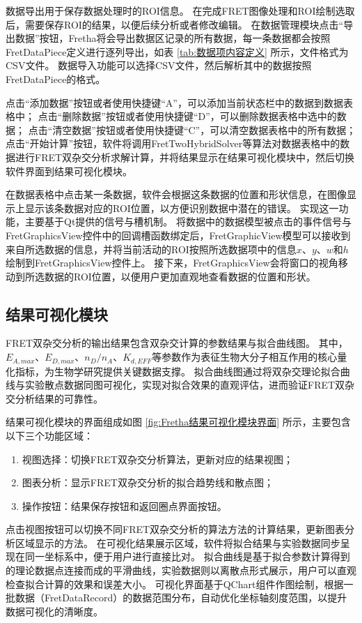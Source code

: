 数据导出用于保存数据处理时的ROI信息。
在完成FRET图像处理和ROI绘制选取后，需要保存ROI的结果，以便后续分析或者修改编辑。
在数据管理模块点击“导出数据”按钮，Fretha将会导出数据区记录的所有数据，每一条数据都会按照FretDataPiece定义进行逐列导出，如表 \ref{tab:数据项内容定义} 所示，文件格式为CSV文件。
数据导入功能可以选择CSV文件，然后解析其中的数据按照FretDataPiece的格式。

点击“添加数据”按钮或者使用快捷键“A”，可以添加当前状态栏中的数据到数据表格中；
点击“删除数据”按钮或者使用快捷键“D”，可以删除数据表格中选中的数据；
点击“清空数据”按钮或者使用快捷键“C”，可以清空数据表格中的所有数据；
点击“开始计算”按钮，软件将调用FretTwoHybridSolver等算法对数据表格中的数据进行FRET双杂交分析求解计算，并将结果显示在结果可视化模块中，然后切换软件界面到结果可视化模块。

在数据表格中点击某一条数据，软件会根据这条数据的位置和形状信息，在图像显示上显示该条数据对应的ROI位置，以方便识别数据中潜在的错误。
实现这一功能，主要基于Qt提供的信号与槽机制。
将数据中的数据模型被点击的事件信号与FretGraphicsView控件中的回调槽函数绑定后，FretGraphicView模型可以接收到来自所选数据的信息，并将当前活动的ROI按照所选数据项中的信息$x$、$y$、$w$和$h$绘制到FretGraphicsView控件上。
接下来，FretGraphicsView会将窗口的视角移动到所选数据的ROI位置，以便用户更加直观地查看数据的位置和形状。

\subsection{结果可视化模块}
\label{sec:结果可视化模块}
\ifshowtext
FRET双杂交分析的输出结果包含双杂交计算的参数结果与拟合曲线图。
其中，$E_{A,max}$、$E_{D,max}$、$n_D/n_A$、$K_{d,EFF}$等参数作为表征生物大分子相互作用的核心量化指标，为生物学研究提供关键数据支撑。
拟合曲线图通过将双杂交理论拟合曲线与实验散点数据同图可视化，实现对拟合效果的直观评估，进而验证FRET双杂交分析结果的可靠性。

结果可视化模块的界面组成如图 \ref{fig:Fretha结果可视化模块界面} 所示，主要包含以下三个功能区域：
\begin{enumerate}
  \item 视图选择：切换FRET双杂交分析算法，更新对应的结果视图；
  \item 图表分析：显示FRET双杂交分析的拟合趋势线和散点图；
  \item 操作按钮：结果保存按钮和返回圈点界面按钮。
\end{enumerate}

点击视图按钮可以切换不同FRET双杂交分析的算法方法的计算结果，更新图表分析区域显示的方法。
在可视化结果展示区域，软件将拟合结果与实验数据同步呈现在同一坐标系中，便于用户进行直接比对。
拟合曲线是基于拟合参数计算得到的理论数据点连接而成的平滑曲线，实验数据则以离散点形式展示，用户可以直观检查拟合计算的效果和误差大小。
可视化界面基于QChart组件作图绘制，根据一批数据（FretDataRecord）的数据范围分布，自动优化坐标轴刻度范围，以提升数据可视化的清晰度。

